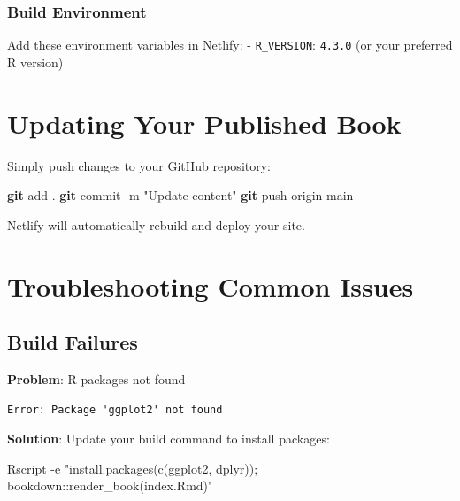 \documentclass[
]{book}
\newenvironment{Shaded}{\begin{snugshade}}{\end{snugshade}}
\newcommand{\AttributeTok}[1]{\textcolor[rgb]{0.13,0.29,0.53}{#1}}
\newcommand{\ExtensionTok}[1]{#1}
\newcommand{\FunctionTok}[1]{\textcolor[rgb]{0.13,0.29,0.53}{\textbf{#1}}}
\newcommand{\NormalTok}[1]{#1}
\newcommand{\StringTok}[1]{\textcolor[rgb]{0.31,0.60,0.02}{#1}}
\begin{document}
\subsubsection{Build Environment}\label{build-environment}

Add these environment variables in Netlify:
- \texttt{R\_VERSION}: \texttt{4.3.0} (or your preferred R version)

\section{Updating Your Published Book}\label{updating-your-published-book}

Simply push changes to your GitHub repository:

\begin{Shaded}
\begin{Highlighting}[]
\FunctionTok{git}\NormalTok{ add .}
\FunctionTok{git}\NormalTok{ commit }\AttributeTok{{-}m} \StringTok{"Update content"}
\FunctionTok{git}\NormalTok{ push origin main}
\end{Highlighting}
\end{Shaded}

Netlify will automatically rebuild and deploy your site.

\section{Troubleshooting Common Issues}\label{troubleshooting-common-issues}

\subsection{Build Failures}\label{build-failures}

\textbf{Problem}: R packages not found

\begin{verbatim}
Error: Package 'ggplot2' not found
\end{verbatim}

\textbf{Solution}: Update your build command to install packages:

\begin{Shaded}
\begin{Highlighting}[]
\ExtensionTok{Rscript} \AttributeTok{{-}e} \StringTok{"install.packages(c(\textquotesingle{}ggplot2\textquotesingle{}, \textquotesingle{}dplyr\textquotesingle{})); bookdown::render\_book(\textquotesingle{}index.Rmd\textquotesingle{})"}
\end{Highlighting}
\end{Shaded}
\end{document}
